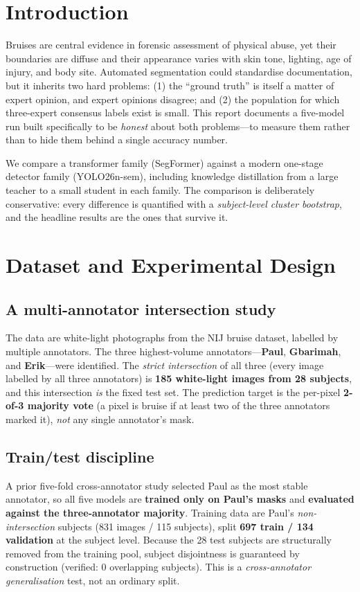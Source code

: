 \documentclass[11pt]{article}
\begin{document}
\section{Introduction}
Bruises are central evidence in forensic assessment of physical abuse, yet their
boundaries are diffuse and their appearance varies with skin tone, lighting, age
of injury, and body site. Automated segmentation could standardise documentation,
but it inherits two hard problems: (1) the ``ground truth'' is itself a matter of
expert opinion, and expert opinions disagree; and (2) the population for which
three-expert consensus labels exist is small. This report documents a five-model
run built specifically to be \emph{honest} about both problems---to measure them
rather than to hide them behind a single accuracy number.

We compare a transformer family (SegFormer) against a modern one-stage detector
family (YOLO26n-sem), including knowledge distillation from a large teacher to a
small student in each family. The comparison is deliberately conservative: every
difference is quantified with a \emph{subject-level cluster bootstrap}, and the
headline results are the ones that survive it.

\section{Dataset and Experimental Design}
\subsection{A multi-annotator intersection study}
The data are white-light photographs from the NIJ bruise dataset, labelled by
multiple annotators. The three highest-volume annotators---\textbf{Paul},
\textbf{Gbarimah}, and \textbf{Erik}---were identified. The \emph{strict
intersection} of all three (every image labelled by all three annotators) is
\textbf{185 white-light images from 28 subjects}, and this intersection
\emph{is} the fixed test set. The prediction target is the per-pixel
\textbf{2-of-3 majority vote} (a pixel is bruise if at least two of the three
annotators marked it), \emph{not} any single annotator's mask.

\subsection{Train/test discipline}
A prior five-fold cross-annotator study selected Paul as the most stable
annotator, so all five models are \textbf{trained only on Paul's masks} and
\textbf{evaluated against the three-annotator majority}. Training data are Paul's
\emph{non-intersection} subjects (831 images / 115 subjects), split
\textbf{697 train / 134 validation} at the subject level. Because the 28 test
subjects are structurally removed from the training pool, subject disjointness is
guaranteed by construction (verified: 0 overlapping subjects). This is a
\emph{cross-annotator generalisation} test, not an ordinary split.
\end{document}
